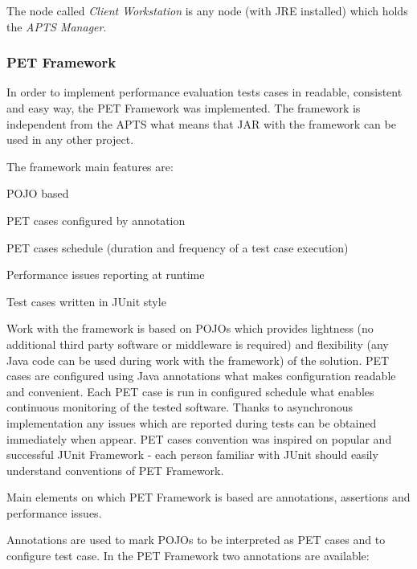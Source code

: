 \documentclass[12pt,a4paper]{article}
\let\tempone\itemize
\let\temptwo\enditemize
\renewenvironment{itemize}{\tempone\addtolength{\itemsep}{-0.4\baselineskip}}{\temptwo}
\begin{document}
The node called \textit{Client Workstation} is any node (with JRE installed) which holds the \textit{APTS Manager}. 


\subsubsection{PET Framework} \label{framework}
 
In order to implement performance evaluation tests cases in readable, consistent and easy way, the PET Framework was implemented. The framework is independent from the APTS what means that JAR with the framework can be used in any other project. 

The framework main features are:
\begin{itemize}
\item POJO based
\item PET cases configured by annotation
\item PET cases schedule (duration and frequency of a test case execution)
\item Performance issues reporting at runtime 
\item Test cases written in JUnit \cite{junit} style
\end{itemize}

Work with the framework is based on POJOs which provides lightness (no additional third party software or middleware is required) and flexibility (any Java code can be used during work with the framework) of the solution. PET cases are  configured using Java annotations what makes configuration readable and convenient. Each PET case is run in configured schedule what enables continuous monitoring of the tested software. Thanks to asynchronous implementation any issues which are reported during tests can be obtained immediately when appear. PET cases convention was inspired on popular and successful JUnit Framework - each person familiar with JUnit should easily understand conventions of PET Framework.       

Main elements on which PET Framework is based are annotations, assertions and performance issues. 

Annotations are used to mark POJOs to be interpreted as PET cases and to configure test case. In the PET Framework two annotations are available:
\end{document}
